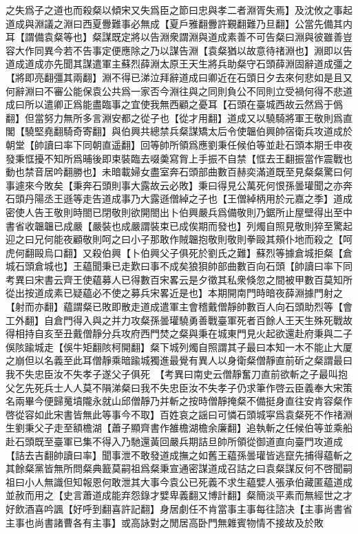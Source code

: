 之失爲子之道也而殺粲以傾宋又失爲臣之節曰忠與孝二者淵胥失焉】及沈攸之事起道成與淵議之淵曰西夏釁難事必無成【夏戶雅翻釁許覲翻難乃旦翻】公當先備其内耳【謂備袁粲等也】粲謀既定將以告淵衆謂淵與道成素善不可告粲曰淵與彼雖善豈容大作同異今若不告事定便應除之乃以謀告淵【袁粲猶以故意待禇淵也】淵即以告道成道成亦先聞其謀遣軍主蘇烈薛淵太原王天生將兵助粲守石頭薛淵固辭道成彊之【將即亮翻彊其兩翻】淵不得已涕泣拜辭道成曰卿近在石頭日夕去來何悲如是且又何辭淵曰不審公能保袁公共爲一家否今淵往與之同則負公不同則立受禍何得不悲道成曰所以遣卿正爲能盡臨事之宜使我無西顧之憂耳【石頭在臺城西故云然爲于僞翻】但當努力無所多言淵安都之從子也【從才用翻】道成又以驍騎將軍王敬則爲直閣【驍堅堯翻騎奇寄翻】與伯興共總禁兵粲謀矯太后令使韞伯興帥宿衛兵攻道成於朝堂【帥讀曰率下同朝直遥翻】回等帥所領爲應劉秉任候伯等並赴石頭本期壬申夜發秉恇擾不知所爲晡後即束裝臨去啜羮寫胷上手振不自禁【恇去王翻振當作震戰也動也禁音居吟翻勝也】未暗載婦女盡室奔石頭部曲數百赫奕滿道既至見粲粲驚曰何事遽來今敗矣【秉奔石頭則事大露故云必敗】秉曰得見公萬死何恨孫曇瓘聞之亦奔石頭丹陽丞王遜等走告道成事乃大露遜僧綽之子也【王僧綽柄用於元嘉之季】道成密使人告王敬則時閤已閉敬則欲開閤出卜伯興嚴兵爲備敬則乃鋸所止屋壁得出至中書省收韞韞已成嚴【嚴裝也成嚴謂裝束已成俟期而發也】列燭自照見敬則猝至驚起迎之曰兄何能夜顧敬則呵之曰小子那敢作賊韞抱敬則敬則拳毆其頰仆地而殺之【呵虎何翻毆烏口翻】又殺伯興【卜伯興父子俱死於劉氏之難】蘇烈等據倉城拒粲【倉城石頭倉城也】王藴聞秉已走歎曰事不成矣狼狽帥部曲數百向石頭【帥讀曰率下同　考異曰宋書云齊王使藴募人已得數百宋畧云是夕徵其私衆倏忽之間被甲數百莫知所從出按道成素已疑藴必不使之募兵宋畧近是也】本期開南門時暗夜薛淵據門射之【射而亦翻】藴謂粲已敗即散走道成遣軍主會稽戴僧靜帥數百人向石頭助烈等【會工外翻】自倉門得入與之并力攻粲孫曇瓘驍勇善戰臺軍死者百餘人王天生殊死戰故得相持自亥至丑戴僧靜分兵攻府西門焚之粲與秉在城東門見火起欲還赴府秉與二子俁陔踰城走【俁牛矩翻陔柯開翻】粲下城列燭自照謂其子最曰本知一木不能止大厦之崩但以名義至此耳僧靜乘暗踰城獨進最覺有異人以身衛粲僧靜直前斫之粲謂最曰我不失忠臣汝不失孝子遂父子俱死　【考異曰南史云僧靜奮刀直前欲斬之子最叫抱父乞先死兵士人人莫不隕涕粲曰我不失忠臣汝不失孝子仍求筆作啓云臣義奉大宋策名兩畢今便歸䰟墳隴永就山邱僧靜乃并斬之按時僧靜掩粲不備挺身直往安肯容粲作啓從容如此宋書皆無此等事今不取】百姓哀之謡曰可憐石頭城寜爲袁粲死不作禇淵生劉秉父子走至額檐湖【蕭子顯齊書作雒檐湖檐余廉翻】追執斬之任候伯等並乘船赴石頭既至臺軍已集不得入乃馳還黃回嚴兵期詰旦帥所領從御道直向臺門攻道成【詰去吉翻帥讀曰率】聞事泄不敢發道成撫之如舊王藴孫曇瓘皆逃竄先捕得藴斬之其餘粲黨皆無所問粲典籖莫嗣祖爲粲秉宣通密謀道成召詰之曰袁粲謀反何不啓聞嗣祖曰小人無識但知報恩何敢泄其大事今袁公已死義不求生藴嬖人張承伯藏匿藴道成並赦而用之【史言蕭道成能弃怨錄才嬖卑義翻又博計翻】粲簡淡平素而無經世之才好飲酒喜吟諷【好呼到翻喜許記翻】身居劇任不肯當事主事每往諮决【主事尚書省主事也尚書諸曹各有主事】或高詠對之閒居高卧門無雜賓物情不接故及於敗

